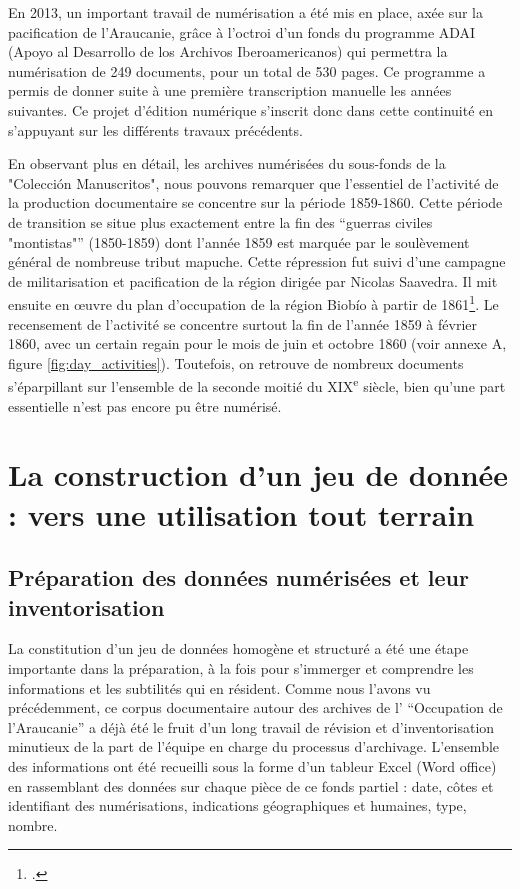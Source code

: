     En 2013, un important  travail de numérisation a été mis en place, axée sur la pacification de l'Araucanie, grâce à l'octroi d'un fonds du programme ADAI (Apoyo al Desarrollo de los Archivos Iberoamericanos) qui permettra la numérisation de 249 documents, pour un total de 530 pages. Ce programme a permis de donner suite à une première transcription manuelle les années suivantes. Ce projet d'édition numérique s'inscrit donc dans cette continuité en s'appuyant sur les différents travaux précédents.\newpar
    
    En observant plus en détail, les archives numérisées du sous-fonds de la "Colección Manuscritos", nous pouvons remarquer que l'essentiel de l'activité de la production documentaire se concentre sur la période 1859-1860. Cette période de transition se situe plus exactement entre la fin des \enquote{guerras civiles "montistas"} (1850-1859) dont l'année 1859 est marquée par le soulèvement général de nombreuse tribut mapuche. Cette répression fut suivi d'une campagne de militarisation et pacification de la région dirigée par Nicolas Saavedra. Il mit ensuite en œuvre du plan d'occupation de la région Biobío à partir de 1861\footcite[p.~165-171]{bengoaHistoriaPuebloMapuche1987}. Le recensement de l'activité se concentre surtout la fin de l'année 1859 à février 1860, avec un certain regain pour le mois de juin et octobre 1860 (voir annexe A, figure \ref{fig:day_activities}). Toutefois, on retrouve de nombreux documents s'éparpillant sur l'ensemble de la seconde moitié du XIX\textsuperscript{e} siècle, bien qu'une part essentielle n'est pas encore pu être numérisé.


	\section{La construction d'un jeu de donnée : vers une utilisation tout terrain}
	
	\subsection{Préparation des données numérisées et leur inventorisation}
	
	La constitution d'un jeu de données homogène et structuré a été une étape importante dans la préparation, à la fois pour s'immerger et comprendre les informations et les subtilités qui en résident. Comme nous l'avons vu précédemment, ce corpus documentaire autour des archives de l' \enquote{Occupation de l'Araucanie} a déjà été le fruit d'un long travail de révision et d'inventorisation minutieux de la part de l'équipe en charge du processus d'archivage. L'ensemble des informations ont été recueilli sous la forme d'un tableur Excel (Word office) en rassemblant des données sur chaque pièce de ce fonds partiel : date, côtes et identifiant des numérisations, indications géographiques et humaines, type, nombre.
	

